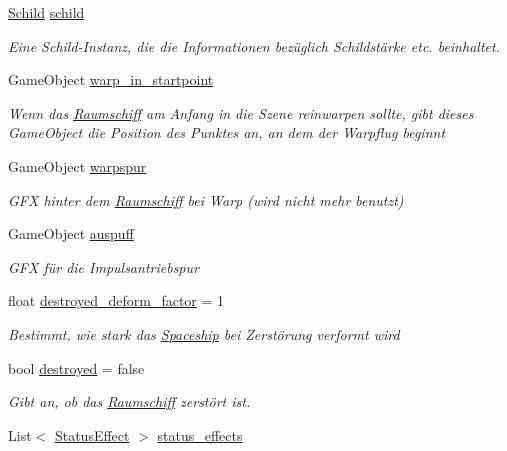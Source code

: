 \begin{DoxyCompactItemize}
\hyperlink{class_schild}{Schild} \hyperlink{class_spaceship_a45e154e6dacd6da7c800c94a05dd27b0}{schild}
\begin{DoxyCompactList}\small\item\em Eine Schild-\/\+Instanz, die die Informationen bezüglich Schildstärke etc. beinhaltet. \end{DoxyCompactList}\item 
Game\+Object \hyperlink{class_spaceship_acef63fb7a63f7ee3cd351ecbbaaf4347}{warp\+\_\+in\+\_\+startpoint}
\begin{DoxyCompactList}\small\item\em Wenn das \hyperlink{class_raumschiff}{Raumschiff} am Anfang in die Szene reinwarpen sollte, gibt dieses Game\+Object die Position des Punktes an, an dem der Warpflug beginnt \end{DoxyCompactList}\item 
Game\+Object \hyperlink{class_spaceship_afe502a70397991dae3950bc9f96d9278}{warpspur}
\begin{DoxyCompactList}\small\item\em G\+FX hinter dem \hyperlink{class_raumschiff}{Raumschiff} bei Warp (wird nicht mehr benutzt) \end{DoxyCompactList}\item 
Game\+Object \hyperlink{class_spaceship_a904d291eba352540e2531359789a182f}{auspuff}
\begin{DoxyCompactList}\small\item\em G\+FX für die Impulsantriebspur \end{DoxyCompactList}\item 
float \hyperlink{class_spaceship_ae434c25796c8b4522fcb41e3abda56d9}{destroyed\+\_\+deform\+\_\+factor} = 1
\begin{DoxyCompactList}\small\item\em Bestimmt, wie stark das \hyperlink{class_spaceship}{Spaceship} bei Zerstörung verformt wird \end{DoxyCompactList}\item 
bool \hyperlink{class_spaceship_a5d9e0a694b1e357eef2f13755e8d2db1}{destroyed} = false
\begin{DoxyCompactList}\small\item\em Gibt an, ob das \hyperlink{class_raumschiff}{Raumschiff} zerstört ist. \end{DoxyCompactList}\item 
List$<$ \hyperlink{class_status_effect}{Status\+Effect} $>$ \hyperlink{class_spaceship_a54d20dc0f35e14abec24c50e060353b8}{status\+\_\+effects}

\end{DoxyCompactItemize}
